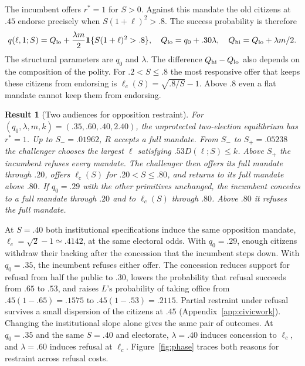 \documentclass[11pt,letterpaper]{article}
\newtheorem{result}{Result}
\begin{document}
The incumbent offers $r^*=1$ for $S>0$. Against this mandate the old citizens at $.45$ endorse precisely when $S(1+\ell)^2>.8$. The success probability is therefore
\begin{equation}
 q(\ell,1;S)=Q_{\rm lo}+\frac{\lambda m}{2}{\bf1}\{S(1+\ell)^2>.8\},
 \quad Q_{\rm lo}=q_0+.30\lambda,\quad Q_{\rm hi}=Q_{\rm lo}+\lambda m/2 .
 \label{eq:civicjump}
\end{equation}
The structural parameters are $q_0$ and $\lambda$. The difference $Q_{\rm hi}-Q_{\rm lo}$ also depends on the composition of the polity. For $.2<S\le .8$ the most responsive offer that keeps these citizens from endorsing is $\ell_c(S)=\sqrt{.8/S}-1$. Above $.8$ even a flat mandate cannot keep them from endorsing.

\begin{result}[Two audiences for opposition restraint]\label{res:civic}
For $(q_0,\lambda,m,k)=(.35,.60,.40,2.40)$, the unprotected two-election equilibrium has $r^*=1$. Up to $S_-=.01962$, $R$ accepts a full mandate. From $S_-$ to $S_+=.05238$ the challenger chooses the largest $\ell$ satisfying $.53D(\ell;S)\le k$. Above $S_+$ the incumbent refuses every mandate. The challenger then offers its full mandate through $.20$, offers $\ell_c(S)$ for $.20<S\le .80$, and returns to its full mandate above $.80$. If $q_0=.29$ with the other primitives unchanged, the incumbent concedes to a full mandate through $.20$ and to $\ell_c(S)$ through $.80$. Above $.80$ it refuses the full mandate.
\end{result}

At $S=.40$ both institutional specifications induce the same opposition mandate, $\ell_c=\sqrt{2}-1\simeq .4142$, at the same electoral odds. With $q_0=.29$, enough citizens withdraw their backing after the concession that the incumbent steps down. With $q_0=.35$, the incumbent refuses either offer. The concession reduces support for refusal from half the public to $.30$, lowers the probability that refusal succeeds from $.65$ to $.53$, and raises $L$'s probability of taking office from $.45(1-.65)=.1575$ to $.45(1-.53)=.2115$. Partial restraint under refusal survives a small dispersion of the citizens at $.45$ (Appendix~\ref{app:civicwork}). Changing the institutional slope alone gives the same pair of outcomes. At $q_0=.35$ and the same $S=.40$ and electorate, $\lambda=.40$ induces concession to $\ell_c$, and $\lambda=.60$ induces refusal at $\ell_c$. Figure~\ref{fig:phase} traces both reasons for restraint across refusal costs.
\end{document}
